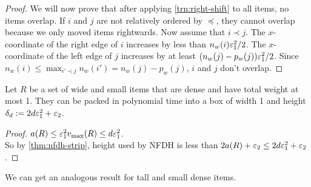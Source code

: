 \begin{proof}
We will now prove that after applying \cref{trn:right-shift} to all items, no items overlap.
If $i$ and $j$ are not relatively ordered by $\preceq$,
they cannot overlap because we only moved items rightwards.
Now assume \wLoG{} that $i \prec j$.
The $x$-coordinate of the right edge of $i$ increases by less than $n_w(i)\varepsilon_1^2/2$.
The $x$-coordinate of the left edge of $j$ increases by at least $(n_w(j) - p_w(j))\varepsilon_1^2/2$.
Since $n_w(i) \le \max_{i' \prec j} n_w(i') = n_w(j) - p_w(j)$,
$i$ and $j$ don't overlap.
\end{proof}

\begin{lemma}
\label{lem:dense-pack}
Let $R$ be a set of wide and small items that are dense and have total weight at most 1.
They can be packed in polynomial time into a box of width 1 and height
$\delta_d := 2d\varepsilon_1^2 + \varepsilon_2$.
\end{lemma}
\begin{proof}
$a(R) \le \varepsilon_1^2 v_{\max}(R) \le d\varepsilon_1^2$.
\\ So by \cref{thm:nfdh-strip}, height used by NFDH is less than
$2a(R) + \varepsilon_2 \le 2d\varepsilon_1^2 + \varepsilon_2$.
\end{proof}
We can get an analogous result for tall and small dense items.

